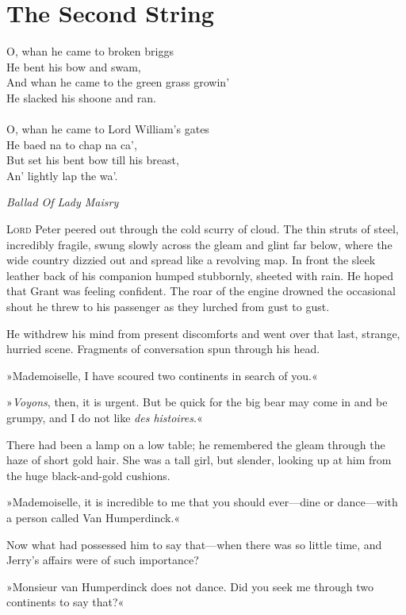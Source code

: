 
\chapter{The Second String}

\epigraph{
O, whan he came to broken briggs\\
He bent his bow and swam,\\
And whan he came to the green grass growin'\\
He slacked his shoone and ran.\\
~\\
O, whan he came to Lord William's gates\\
He baed na to chap na ca',\\
But set his bent bow till his breast,\\
An' lightly lap the wa'.}{\textit{Ballad Of Lady Maisry}}



\lettrine[lines=4]{L}{ord} Peter peered out through the cold scurry of cloud. The thin
struts of steel, incredibly fragile, swung slowly across the gleam
and glint far below, where the wide country dizzied out and spread
like a revolving map. In front the sleek leather back of his companion
humped stubbornly, sheeted with rain. He hoped that Grant was feeling
confident. The roar of the engine drowned the occasional shout he threw
to his passenger as they lurched from gust to gust.

He withdrew his mind from present discomforts and went over that last,
strange, hurried scene. Fragments of conversation spun through his head.

»Mademoiselle, I have scoured two continents in search of you.«

»\textit{Voyons}, then, it is urgent. But be quick for the big bear may come
in and be grumpy, and I do not like \textit{des histoires}.«

There had been a lamp on a low table; he remembered the gleam through
the haze of short gold hair. She was a tall girl, but slender, looking
up at him from the huge black-and-gold cushions.

»Mademoiselle, it is incredible to me that you should ever—dine or
dance—with a person called Van Humperdinck.«

Now what had possessed him to say that—when there was so little time,
and Jerry's affairs were of such importance?

»Monsieur van Humperdinck does not dance. Did you seek me through two
continents to say that?«

